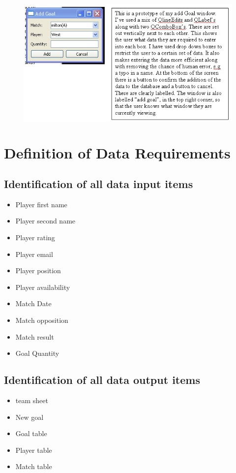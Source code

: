 \begin{figure}[H]
	\includegraphics[width=150mm]{AddGoalPT}	
\end{figure}

\section{Definition of Data Requirements}

\subsection{Identification of all data input items}
\begin{itemize}
\item Player first name
\item Player second name
\item Player rating
\item Player email
\item Player position
\item Player availability
\item Match Date
\item Match opposition
\item Match result
\item Goal Quantity 

\end{itemize}

\subsection{Identification of all data output items}
\begin{itemize}
\item team sheet
\item New goal
\item Goal table
\item Player table
\item Match table
\end{itemize}
